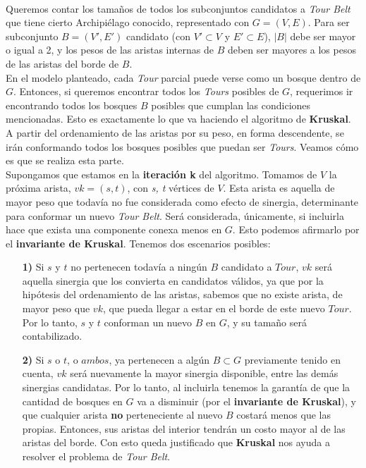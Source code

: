 \documentclass[../main.tex]{subfiles}
\begin{document}
\paragraph{} Queremos contar los tamaños de todos los subconjuntos candidatos a \textit{Tour Belt} que tiene cierto Archipiélago conocido, representado con \(G = (V, E)\). Para ser subconjunto \(B = (V', E')\) candidato (con $V' \subset V$ y $E' \subset E$), $|B|$ debe ser mayor o igual a 2, y los pesos de las aristas internas de $B$ deben ser mayores a los pesos de las aristas del borde de $B$. \\
En el modelo planteado, cada \textit{Tour} parcial puede verse como un bosque dentro de $G$. Entonces, si queremos encontrar todos los \textit{Tours} posibles de $G$, requerimos ir encontrando todos los bosques $B$ posibles que cumplan las condiciones mencionadas. Esto es exactamente lo que va haciendo el algoritmo de \textbf{Kruskal}. A partir del ordenamiento de las aristas por su peso, en forma descendente, se ir\'an conformando todos los bosques posibles que puedan ser \textit{Tours}. Veamos cómo es que se realiza esta parte. \\
Supongamos que estamos en la \textbf{iteración k} del algoritmo. Tomamos de $V$ la próxima arista, \(vk =(s,t)\), con \textit{s, t} vértices de $V$. Esta arista es aquella de mayor peso que todavía no fue considerada como efecto de sinergia, determinante para conformar un nuevo \textit{Tour Belt}. Será considerada, únicamente, si incluirla hace que exista una componente conexa menos en $G$. 
Esto podemos afirmarlo por el \textbf{invariante de Kruskal}. Tenemos dos escenarios posibles:
\begin{itemize}
  \item[\textbf{1)}] Si $s$ y $t$ no pertenecen todavía a ningún $B$ candidato a $Tour$, $vk$ será aquella sinergia que los convierta en candidatos válidos, ya que por la hipótesis del ordenamiento de las aristas, sabemos que no existe arista, de mayor peso que $vk$, que pueda llegar a estar en el borde de este nuevo $Tour$. Por lo tanto, $s$ y $t$ conforman un nuevo $B$ en $G$, y su tamaño será contabilizado. 
  \item[\textbf{2)}] Si $s$ o $t$, o $ambos$, ya pertenecen a algún $B \subset G$ previamente tenido en cuenta, $vk$ será nuevamente la mayor sinergia disponible, entre las demás sinergias candidatas. Por lo tanto, al incluirla tenemos la garantía de que la cantidad de bosques en $G$ va a disminuir (por el \textbf{invariante de Kruskal}), y que cualquier arista \textbf{no} perteneciente al nuevo $B$ %
    costar\'a menos que las propias. Entonces, sus aristas del interior tendr\'an un costo mayor al de las aristas del borde. Con esto queda justificado que \textbf{Kruskal} nos ayuda a resolver el problema de \textit{Tour Belt}.
\end{itemize}
\end{document}
